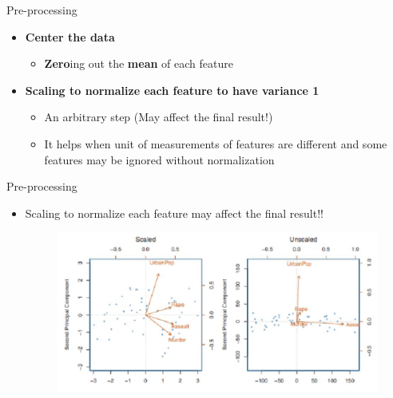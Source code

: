 \documentclass[serif, aspectratio=169]{beamer}
\begin{document}
\begin{frame}{Pre-processing}
    \begin{itemize}
        \item \textbf{Center the data}
            \begin{itemize}
                \item \textbf{Zero}ing out the \textbf{mean} of each feature\\
            \end{itemize}
            
        \item \textbf{Scaling to normalize each feature to have variance 1}
            \begin{itemize}
                \item An arbitrary step (May affect the final result!)
                \item It helps when unit of measurements of features are different and some features may be ignored without normalization
            \end{itemize}
    \end{itemize}
\end{frame}


\begin{frame}{Pre-processing}
    \begin{itemize}
        \item Scaling to normalize each feature may affect the final result!!
        \begin{figure}[htpb]
            \begin{center}
                \includegraphics[keepaspectratio, scale=0.6]{pic/pcaScaling.JPG}
            \end{center}
        \end{figure}
    \end{itemize}
\end{frame}
\end{document}
